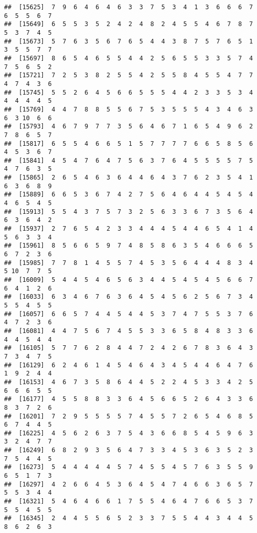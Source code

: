 \documentclass[
]{book}
\begin{document}
\begin{verbatim}
##  [15625]  7  9  6  4  6  4  6  3  3  7  5  3  4  1  3  6  6  6  7  6  5  5  6  7
##  [15649]  6  5  5  3  5  2  4  2  4  8  2  4  5  5  4  6  7  8  7  5  3  7  4  5
##  [15673]  5  7  6  3  5  6  7  6  5  4  4  3  8  7  5  7  6  5  1  3  5  5  7  7
##  [15697]  8  6  5  4  6  5  5  4  4  2  5  6  5  5  3  3  5  7  4  7  5  6  5  2
##  [15721]  7  2  5  3  8  2  5  5  4  2  5  5  8  4  5  5  4  7  7  4  7  4  3  6
##  [15745]  5  5  2  6  4  5  6  6  5  5  5  4  4  2  3  3  5  3  4  4  4  4  4  5
##  [15769]  4  4  7  8  8  5  5  6  7  5  3  5  5  5  4  3  4  6  3  6  3 10  6  6
##  [15793]  4  6  7  9  7  7  3  5  6  4  6  7  1  6  5  4  9  6  2  7  8  6  5  7
##  [15817]  6  5  5  4  6  6  5  1  5  7  7  7  7  6  6  5  8  5  6  4  5  3  6  7
##  [15841]  4  5  4  7  6  4  7  5  6  3  7  6  4  5  5  5  5  7  5  4  7  6  3  5
##  [15865]  2  6  5  4  6  3  6  4  4  6  4  3  7  6  2  3  5  4  1  6  3  6  8  9
##  [15889]  6  6  5  3  6  7  4  2  7  5  6  4  6  4  4  5  4  5  4  4  6  5  4  5
##  [15913]  5  5  4  3  7  5  7  3  2  5  6  3  3  6  7  3  5  6  4  6  3  6  4  2
##  [15937]  2  7  6  5  4  2  3  3  4  4  4  5  4  4  6  5  4  1  4  5  6  3  3  4
##  [15961]  8  5  6  6  5  9  7  4  8  5  8  6  3  5  4  6  6  6  5  6  7  2  3  6
##  [15985]  7  7  8  1  4  5  5  7  4  5  3  5  6  4  4  4  8  3  4  5 10  7  7  5
##  [16009]  5  4  4  5  4  6  5  6  3  4  4  5  4  5  4  5  6  6  7  6  4  1  2  6
##  [16033]  6  3  4  6  7  6  3  6  4  5  4  5  6  2  5  6  7  3  4  5  5  4  5  5
##  [16057]  6  6  5  7  4  4  5  4  4  5  3  7  4  7  5  5  3  7  6  4  7  2  3  6
##  [16081]  4  4  7  5  6  7  4  5  5  3  3  6  5  8  4  8  3  3  6  4  4  5  4  4
##  [16105]  5  7  7  6  2  8  4  4  7  2  4  2  6  7  8  3  6  4  3  7  3  4  7  5
##  [16129]  6  2  4  6  1  4  5  4  6  4  3  4  5  4  4  6  4  7  6  1  9  2  4  4
##  [16153]  4  6  7  3  5  8  6  4  4  5  2  2  4  5  3  3  4  2  5  6  6  6  5  5
##  [16177]  4  5  5  8  8  3  3  6  4  5  6  6  5  2  6  4  3  3  6  8  3  7  2  6
##  [16201]  7  2  9  5  5  5  5  7  4  5  5  7  2  6  5  4  6  8  5  6  7  4  4  5
##  [16225]  4  5  6  2  6  3  7  5  4  3  6  6  8  5  4  5  9  6  3  3  2  4  7  7
##  [16249]  6  8  2  9  3  5  6  4  7  3  3  4  5  3  6  3  5  2  3  7  5  4  4  5
##  [16273]  5  4  4  4  4  4  5  7  4  5  5  4  5  7  6  3  5  5  9  6  5  1  7  3
##  [16297]  4  2  6  6  4  5  3  6  4  5  4  7  4  6  6  3  6  5  7  5  5  3  4  4
##  [16321]  5  4  6  4  6  6  1  7  5  5  4  6  4  7  6  6  5  3  7  5  5  4  5  5
##  [16345]  2  4  4  5  5  6  5  2  3  3  7  5  5  4  4  3  4  4  5  8  6  2  6  3

\end{verbatim}
\end{document}
